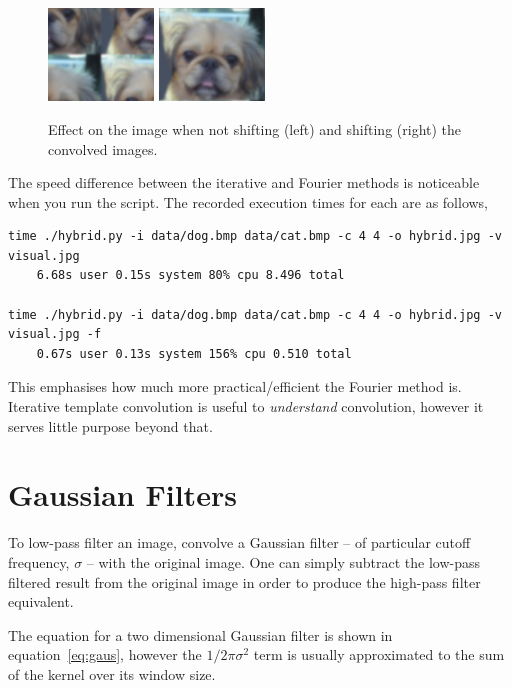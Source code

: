\documentclass[a4paper]{article}
\begin{document}
\begin{figure}[!htbp]
    \centering
    \includegraphics[width=0.25\textwidth]{../no_shift}
    \includegraphics[width=0.25\textwidth]{../low}    
    \caption{Effect on the image when not shifting (left) and shifting (right) the convolved images.}
    \label{fig:no-shift}
\end{figure}

The speed difference between the iterative and Fourier methods is noticeable when you run the script. The recorded execution times for each are as follows,

\begin{verbatim}
time ./hybrid.py -i data/dog.bmp data/cat.bmp -c 4 4 -o hybrid.jpg -v visual.jpg  
    6.68s user 0.15s system 80% cpu 8.496 total
    
time ./hybrid.py -i data/dog.bmp data/cat.bmp -c 4 4 -o hybrid.jpg -v visual.jpg -f 
    0.67s user 0.13s system 156% cpu 0.510 total
\end{verbatim}

This emphasises how much more practical/efficient the Fourier method is. Iterative template convolution is useful to \textit{understand} convolution, however it serves little purpose beyond that.

\section{Gaussian Filters}
To low-pass filter an image, convolve a Gaussian filter -- of particular cutoff frequency, $\sigma$ -- with the original image. One can simply subtract the low-pass filtered result from the original image in order to produce the high-pass filter equivalent. 

The equation for a two dimensional Gaussian filter is shown in equation~\ref{eq:gaus}, however the $1/2\pi\sigma^2$ term is usually approximated to the sum of the kernel over its window size.
\end{document}
